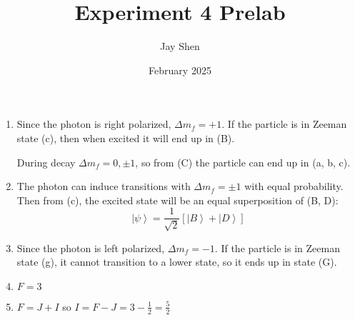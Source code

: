 \documentclass[12pt, letterpaper]{article}
\title{Experiment 4 Prelab}
\author{Jay Shen}
\date{February 2025}
\begin{document}
\maketitle

\begin{enumerate}
    \item {
        Since the photon is right polarized, $\Delta m_f = +1$. If the particle is in Zeeman state (c), then when excited it will end up in (B). 

        During decay $\Delta m_f = 0, \pm 1$, so from (C) the particle can end up in (a, b, c). 
    }
    \item{
        The photon can induce transitions with $\Delta m_f = \pm 1$ with equal probability. Then from (c), the excited state will be an equal superposition of (B, D): 
        \[
            \left|\psi\right\rangle = \frac{1}{\sqrt{2}}[\left|B\right\rangle + \left|D\right\rangle]
        \]
    }
    \item{
        Since the photon is left polarized, $\Delta m_f = -1$. If the particle is in Zeeman state (g), it cannot transition to a lower state, so it ends up in state (G). 
    }
    \item {
        $F = 3$
    }
    \item {
        $F = J + I$ so $I = F - J = 3 - \frac{1}{2} = \frac{5}{2}$
    }
\end{enumerate}
\end{document}
